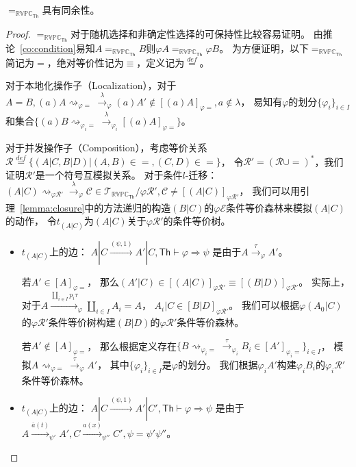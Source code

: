 \begin{theorem}
   $=_{\mathbb{RVPC}_{\mathsf{Th}}}$具有同余性。
\end{theorem}
\begin{proof}
   $=_{\mathbb{RVPC}_{\mathsf{Th}}}$对于随机选择和非确定性选择的可保持性比较容易证明。
   由推论~\ref{co:condition}易知$A=_{\mathbb{RVPC}_{\mathsf{Th}}}B$则$\varphi A=_{\mathbb{RVPC}_{\mathsf{Th}}}\varphi B$。
   为方便证明，以下$=_{\mathbb{RVPC}_{\mathsf{Th}}}$简记为$=$，绝对等价性记为$\equiv$，定义记为$\stackrel{def}{=}$。
   
   对于本地化操作子（Localization），对于$A=B,(a)A\rightsquigarrow_{\varphi=}\stackrel{\lambda}{\rightarrow}_{\varphi} (a)A'\notin [(a)A]_{\varphi =}, a\notin \lambda$，
   易知有$\varphi$的划分$\{\varphi_i\}_{i\in I}$和集合$\{(a)B\rightsquigarrow_{\varphi_i=}\stackrel{\lambda}{\rightarrow}_{\varphi_i}[(a)A]_{\varphi =}\}$。

   对于并发操作子（Composition），考虑等价关系$\mathcal{R}\stackrel{def}{=}\{(A|C,B|D)|(A,B)\in =,(C,D)\in =\}$，
   令$\mathcal{R}' = (\mathcal{R}\cup =)^*$，我们证明$\mathcal{R}'$是一个符号互模拟关系。
   对于条件$l$-迁移：$(A|C)\rightsquigarrow_{\varphi\mathcal{R'}}\stackrel{\lambda}{\rightarrow}_{\varphi}\mathcal{C}\in\mathcal{T}_{\mathbb{RVPC}_{\mathsf{Th}}}/\varphi \mathcal{R}',\mathcal{C}\neq [(A|C)]_{\varphi\mathcal{R}'}$，
   我们可以用引理~\ref{lemma:closure}中的方法递归的构造$(B|C)$的$\varphi\mathcal{E}$条件等价森林来模拟$(A|C)$的动作，
   令$t_{(A|C)}$为$(A|C)$关于$\varphi\mathcal{R'}$的条件等价树。
   \begin{itemize}
      \item {
         $t_{(A|C)}$上的边：
         $A|C\stackrel{(\psi, 1)}{\rightarrow} A'|C, \mathsf{Th}\vdash \varphi\Rightarrow\psi$
         是由于$A\stackrel{\tau}{\rightarrow}_{\varphi} A'$。

         若$A'\in [A]_{\varphi =}$，
         那么$(A'|C)\in[(A|C)]_{\varphi\mathcal{R}'}\equiv[(B|D)]_{\varphi\mathcal{R}'}$。
         实际上，对于$A\stackrel{\coprod_{i\in I}p_i\tau}{\rightarrow}_{\varphi} \coprod_{i\in I} A_i=A$，
         $A_i|C\in [B|D]_{\varphi\mathcal{R}'}$。
         我们可以根据$\varphi (A_0|C)$的$\varphi\mathcal{R}'$条件等价树构建$(B|D)$的$\varphi\mathcal{R}'$条件等价森林。

         若$A'\notin [A]_{\varphi =}$，
         那么根据定义存在$\{B\rightsquigarrow_{\varphi_i\mathcal{=}}\stackrel{\tau}{\rightarrow}_{\varphi_i}B_i\in [A']_{\varphi_i =}\}_{i\in I}$，
         模拟$A\rightsquigarrow_{\varphi =}\stackrel{\tau}{\rightarrow}_{\varphi} A'$，
         其中$\{\varphi_i\}_{i\in I}$是$\varphi$的划分。
         我们根据$\varphi_i A'$构建$\varphi_i B_i$的$\varphi_i \mathcal{R}'$条件等价森林。
      }
      \item {
         $t_{(A|C)}$上的边：
         $A|C\stackrel{(\psi, 1)}{\rightarrow} A'|C', \mathsf{Th}\vdash \varphi\Rightarrow\psi$
         是由于$A\stackrel{\overline{a}(t)}{\longrightarrow}_{\psi'} A', C\stackrel{a(x)}{\longrightarrow}_{\psi''} C', \psi=\psi'\psi''$。

}
\end{itemize}
\end{proof}
